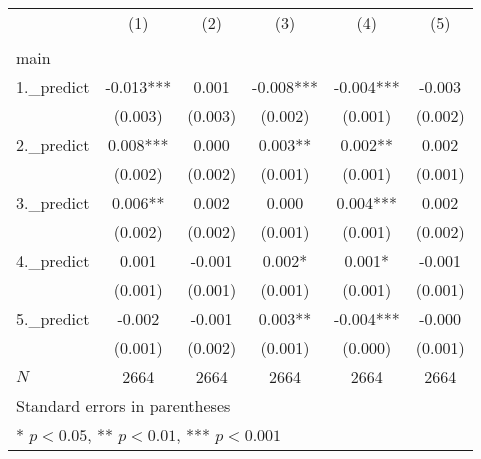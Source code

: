 
\begin{tabular}{l*{5}{c}}
\hline\hline
            &\multicolumn{1}{c}{(1)}&\multicolumn{1}{c}{(2)}&\multicolumn{1}{c}{(3)}&\multicolumn{1}{c}{(4)}&\multicolumn{1}{c}{(5)}\\
            &\multicolumn{1}{c}{} &\multicolumn{1}{c}{} &\multicolumn{1}{c}{} &\multicolumn{1}{c}{} &\multicolumn{1}{c}{} \\
\hline
main        &                     &                     &                     &                     &                     \\
1.\_predict  &      -0.013{***}&       0.001         &      -0.008{***}&      -0.004{***}&      -0.003         \\
            &     (0.003)         &     (0.003)         &     (0.002)         &     (0.001)         &     (0.002)         \\
[1em]
2.\_predict  &       0.008{***}&       0.000         &       0.003{**} &       0.002{**} &       0.002         \\
            &     (0.002)         &     (0.002)         &     (0.001)         &     (0.001)         &     (0.001)         \\
[1em]
3.\_predict  &       0.006{**} &       0.002         &       0.000         &       0.004{***}&       0.002         \\
            &     (0.002)         &     (0.002)         &     (0.001)         &     (0.001)         &     (0.002)         \\
[1em]
4.\_predict  &       0.001         &      -0.001         &       0.002{*}  &       0.001{*}  &      -0.001         \\
            &     (0.001)         &     (0.001)         &     (0.001)         &     (0.001)         &     (0.001)         \\
[1em]
5.\_predict  &      -0.002         &      -0.001         &       0.003{**} &      -0.004{***}&      -0.000         \\
            &     (0.001)         &     (0.002)         &     (0.001)         &     (0.000)         &     (0.001)         \\
\hline
\(N\)       &        2664         &        2664         &        2664         &        2664         &        2664         \\
\hline\hline
\multicolumn{6}{l}{\footnotesize Standard errors in parentheses}\\
\multicolumn{6}{l}{\footnotesize {*} \(p<0.05\), {**} \(p<0.01\), {***} \(p<0.001\)}\\
\end{tabular}
